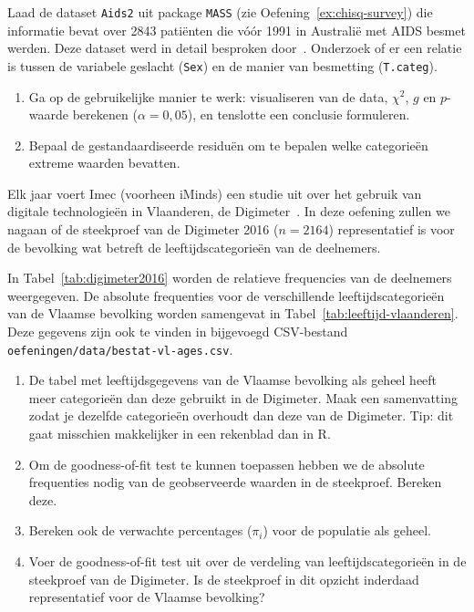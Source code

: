 \begin{exercise}
  \label{ex:chisq-aids2}
  Laad de dataset \texttt{Aids2} uit package \texttt{MASS} (zie Oefening~\ref{ex:chisq-survey}) die informatie bevat over 2843 patiënten die vóór 1991 in Australië met AIDS besmet werden. Deze dataset werd in detail besproken door~\textcite{Ripley2007}. Onderzoek of er een relatie is tussen de variabele geslacht (\texttt{Sex}) en de manier van besmetting (\texttt{T.categ}).
  
  \begin{enumerate}
    \item Ga op de gebruikelijke manier te werk: visualiseren van de data, $\chi^2$, $g$ en $p$-waarde berekenen ($\alpha = 0,05$), en tenslotte een conclusie formuleren.
    \item Bepaal de gestandaardiseerde residuën om te bepalen welke categorieën extreme waarden bevatten.
  \end{enumerate}
  
\end{exercise}

\begin{exercise}
  \label{ex:chisq-digimeter}
  
  Elk jaar voert Imec (voorheen iMinds) een studie uit over het gebruik van digitale technologieën in Vlaanderen, de Digimeter~\autocite{Vanhaelewyn2016}. In deze oefening zullen we nagaan of de steekproef van de Digimeter 2016 ($n = 2164$) representatief is voor de bevolking wat betreft de leeftijdscategorieën van de deelnemers.
  
  In Tabel~\ref{tab:digimeter2016} worden de relatieve frequencies van de deelnemers weergegeven. De absolute frequenties voor de verschillende leeftijdscategorieën van de Vlaamse bevolking worden samengevat in Tabel~\ref{tab:leeftijd-vlaanderen}. Deze gegevens zijn ook te vinden in bijgevoegd CSV-bestand \texttt{oefeningen/data/bestat-vl-ages.csv}.
  
  \begin{enumerate}
    \item De tabel met leeftijdsgegevens van de Vlaamse bevolking als geheel heeft meer categorieën dan deze gebruikt in de Digimeter. Maak een samenvatting zodat je dezelfde categorieën overhoudt dan deze van de Digimeter. Tip: dit gaat misschien makkelijker in een rekenblad dan in R.
    \item Om de goodness-of-fit test te kunnen toepassen hebben we de absolute frequenties nodig van de geobserveerde waarden in de steekproef. Bereken deze.
    \item Bereken ook de verwachte percentages ($\pi_{i}$) voor de populatie als geheel.
    \item Voer de goodness-of-fit test uit over de verdeling van leeftijdscategorieën in de steekproef van de Digimeter. Is de steekproef in dit opzicht inderdaad representatief voor de Vlaamse bevolking?
  \end{enumerate}
\end{exercise}

